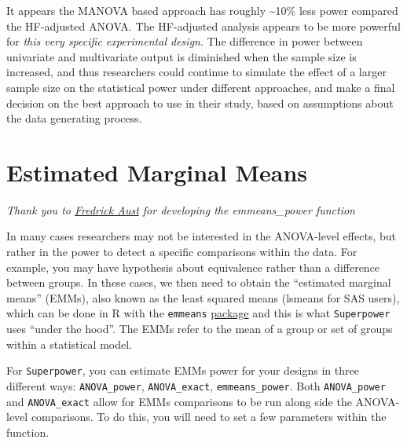 \documentclass[
]{book}
\begin{document}
\newpage

It appears the MANOVA based approach has roughly \textasciitilde10\% less power compared the HF-adjusted ANOVA.
The HF-adjusted analysis appears to be more powerful for \emph{this very specific experimental design}.
The difference in power between univariate and multivariate output is diminished when the sample size is increased, and thus researchers could continue to simulate the effect of a larger sample size on the statistical power under different approaches, and make a final decision on the best approach to use in their study, based on assumptions about the data generating process.

\hypertarget{estimated-marginal-means}{%
\chapter{Estimated Marginal Means}\label{estimated-marginal-means}}

\emph{Thank you to \href{https://github.com/crsh}{Fredrick Aust} for developing the emmeans\_power function}

In many cases researchers may not be interested in the ANOVA-level effects, but rather in the power to detect a specific comparisons within the data. For example, you may have hypothesis about equivalence rather than a difference between groups. In these cases, we then need to obtain the ``estimated marginal means'' (EMMs), also known as the least squared means (lsmeans for SAS users), which can be done in R with the \texttt{emmeans} \href{https://cran.r-project.org/web/packages/emmeans/index.html}{package} and this is what \texttt{Superpower} uses ``under the hood''. The EMMs refer to the mean of a group or set of groups within a statistical model.

For \texttt{Superpower}, you can estimate EMMs power for your designs in three different ways: \texttt{ANOVA\_power}, \texttt{ANOVA\_exact}, \texttt{emmeans\_power}. Both \texttt{ANOVA\_power} and \texttt{ANOVA\_exact} allow for EMMs comparisons to be run along side the ANOVA-level comparisons. To do this, you will need to set a few parameters within the function.
\end{document}
